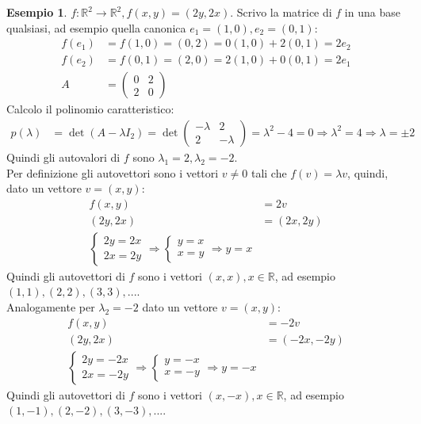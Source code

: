 \documentclass[a4paper]{article}
\theoremstyle{definition}
\newtheorem*{es}{Esempio}
\begin{document}
	\begin{es}
		$f: \mathbb{R}^2 \to \mathbb{R}^2, f(x, y) = (2y, 2x)$.
		Scrivo la matrice di $f$ in una base qualsiasi, ad esempio quella canonica $e_1 = (1, 0), e_2 = (0, 1)$:
		\begin{align*}
			f(e_1) &= f(1, 0) = (0, 2) = 0(1, 0) + 2(0, 1) = 2e_2 \\
			f(e_2) &= f(0, 1) = (2, 0) = 2(1, 0) + 0(0, 1) = 2e_1 \\
			A &= \begin{pmatrix}
				0 & 2 \\
				2 & 0
			\end{pmatrix}
		\end{align*}
		Calcolo il polinomio caratteristico:
		\begin{align*}
			p(\lambda) &= \det(A - \lambda I_2) = \det \begin{pmatrix}
				- \lambda & 2 \\
				2 & - \lambda
			\end{pmatrix} = \lambda^2 - 4 = 0 \Rightarrow \lambda^2 = 4 \Rightarrow \lambda = \pm 2
		\end{align*}
		Quindi gli autovalori di $f$ sono $\lambda_1 = 2, \lambda_2 = -2$. \\
		Per definizione gli autovettori sono i vettori $v \ne 0$ tali che $f(v) = \lambda v$, quindi, dato un vettore $v = (x, y)$:
		\begin{align*}
			f(x, y) &= 2v \\
			(2y, 2x) &= (2x, 2y) \\
			\begin{cases}
				2y = 2x \\
				2x = 2y
			\end{cases} \Rightarrow \begin{cases}
				y = x \\
				x = y
			\end{cases} \Rightarrow y = x
		\end{align*}
		Quindi gli autovettori di $f$ sono i vettori $(x, x), x \in \mathbb{R}$, ad esempio $(1, 1), (2, 2), (3, 3), ...$. \\
		Analogamente per $\lambda_2 = -2$ dato un vettore $v = (x, y)$:
		\begin{align*}
			f(x, y) &= -2v \\
			(2y, 2x) &= (-2x, -2y) \\
			\begin{cases}
				2y = -2x \\
				2x = -2y
			\end{cases} \Rightarrow \begin{cases}
				y = -x \\
				x = -y
			\end{cases} \Rightarrow y = - x
		\end{align*}
		Quindi gli autovettori di $f$ sono i vettori $(x, -x), x \in \mathbb{R}$, ad esempio $(1, -1), (2, -2), (3, -3), ...$.
	\end{es}
\end{document}
